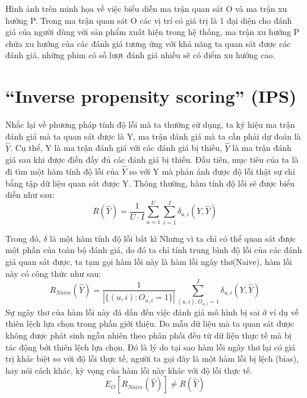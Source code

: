 Hình ảnh trên minh họa về việc biểu diễn ma trận quan sát O và ma trận xu hướng P. Trong ma trận quan sát O các vị trí có giá trị là 1 đại diện cho đánh giá của người dùng với sản phẩm xuất hiện trong hệ thống, ma trận xu hướng P chứa xu hướng của các đánh giá tương ứng với khả năng ta quan sát được các đánh giá, những phim có số lượt đánh giá nhiều sẽ có điểm xu hướng cao.

\section{``Inverse propensity scoring'' (IPS)}

Nhắc lại về phương pháp tính độ lỗi mà ta thường sử dụng, ta  ký hiệu ma trận đánh giá mà ta quan sát được là Y, ma trận đánh giá mà ta cần phải dự đoán là $\hat{Y}$. Cụ thể, Y là ma trận đánh giá với các đánh giá bị thiếu, $\hat{Y}$ là ma trận đánh giá sau khi được điền đầy đủ các đánh giá bị thiếu. Đầu tiên, mục tiêu của ta là đi tìm một hàm tính độ lỗi của $\hat{Y}$ so với Y mà phản ánh được độ lỗi thật sự chỉ bằng tập dữ liệu quan sát được Y. Thông thường, hàm tính độ lỗi sẽ được biểu diễn như sau:
\begin{equation}
\label{eq:tradition}
R(\hat{Y}) = \frac{1}{U\cdot I}  \sum_{u=1}^{U} \sum_{i=1}^{I} \delta_{u,i}(Y,\hat{Y})
\end{equation}

Trong đó, $\delta$ là một hàm tính độ lỗi bất kì
Nhưng vì ta chỉ có thể quan sát được một phần của toàn bộ đánh giá, do đó ta chỉ tính trung bình độ lỗi của các đánh giá quan sát được, ta tạm gọi hàm lỗi này là hàm lỗi ngây thơ(Naive), hàm lỗi này có công thức như sau:
\begin{equation}
\label{eq:naive}
R_{Naive}(\hat{Y}) = \frac{1}{|\{(u,i):O_{u,i} = 1\}|} \sum_{(u,i):O_{u,i}=1}^{I} \delta_{u,i}(Y,\hat{Y}) 
\end{equation}
Sự ngây thơ của hàm lỗi này đã dấn đến việc đánh giá mô hình bị sai ở ví dụ về thiên lệch lựa chọn trong phần giới thiệu. Do mẫu dữ liệu mà ta quan sát được không được phát sinh ngẫu nhiên theo phân phối đều từ dữ liệu thực tế mà bị tác động bởi thiên lệch lựa chọn. Đó là lý do tại sao hàm lỗi ngây thơ lại có giá trị khác biệt so với độ lỗi thực tế, người ta gọi đây là một hàm lỗi bị lệch (bias), hay nói cách khác, kỳ vọng của hàm lỗi này khác với độ lỗi thực tế.
\[E_O [R_{Naive} (\hat{Y})] \ne R(\hat{Y})\]

